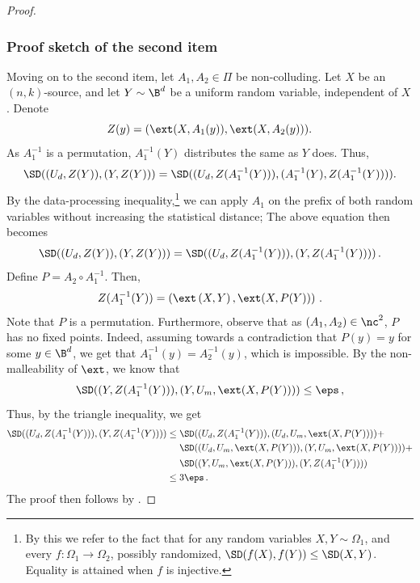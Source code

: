 \begin{proof}
%
\subsubsection*{Proof sketch of the second item}
	
Moving on to the second item, let $A_1,A_2 \in \Pi$ be %
non-colluding.
Let $X$ be an $(n,k)$-source, and let $Y \sim \B^{d}$ be 
	a uniform random variable, independent of $X$. Denote	
	\[
	Z(y) = ( \ext(X,A_{1}(y)),\ext(X,A_{2}(y)) ).
	\]
	As $A_{1}^{-1}$ is a permutation, $A_1^{-1}(Y)$ distributes the same as $Y$ does. Thus,
	\[
	\SD((U_d,Z(Y)),(Y,Z(Y))) = 
	\SD((U_d,Z(A_{1}^{-1}(Y))),({A}_{1}^{-1}(Y),{Z}({A}_{1}^{-1}(Y)))).
	\]
	By the data-processing inequality,\footnote{By this we refer to the fact that for any random variables
	$X,Y \sim \Omega_1$, and every $f \colon \Omega_1 \rightarrow \Omega_2$, possibly randomized, $\SD(f(X),f(Y)) \le \SD(X,Y)$. Equality is attained when $f$ is injective.}
	we can apply ${A}_1$ on the prefix of both random variables without increasing
	the statistical distance; The above equation then becomes
	\begin{equation}\label{eq:sec423 i}
	\SD((U_d,{Z}(Y)),(Y,{Z}(Y))) = 
	\SD((U_d,{Z}({A}_{1}^{-1}(Y))),(Y,{Z}({A}_{1}^{-1}(Y))))\,.
	\end{equation}
	Define $P = {A}_{2} \circ {A}_{1}^{-1}$. Then,
	\begin{align*}
	{Z}({A}_{1}^{-1}(Y)) = 
	\left( \ext\left( X,Y \right),\ext( X,P(Y)) \right)\,.
	\end{align*}
	Note that $P$ is a permutation. Furthermore, observe that as $({A}_1,{A}_{2}) \in \nc^{2}$,  $P$ has no fixed points. Indeed, assuming
	towards a contradiction that $P(y)=y$ for some $y \in \B^{d}$, we get
	that ${A}_{1}^{-1}(y) = {A}^{-1}_{2}(y)$, which is impossible.
	By the non-malleability of $\ext$, we know that
	\[
	\SD((Y,{Z}({A}_1^{-1}(Y))),(Y,U_m,\ext(X,P(Y)))) \le \eps\,,
	\]
    Thus, by the triangle inequality, we get
	\begin{align}
	\SD((U_d,{Z}({A}_{1}^{-1}(Y))),(Y,{Z}({A}_{1}^{-1}(Y)))) &\le 
	\SD((U_d,{Z}({A}_{1}^{-1}(Y))),(U_d,U_m,\ext(X,P(Y)))) + \nonumber \\
	& ~~~~\SD((U_d,U_m,\ext(X,P(Y))),(Y,U_m,\ext(X,P(Y)))) + \nonumber \\
	& ~~~~\SD((Y,U_m,\ext(X,P(Y))),(Y,{Z}({A}_{1}^{-1}(Y)))) \nonumber \\
	&\le 3\eps\,.
	\end{align}
	The proof then follows by .
\end{proof}

